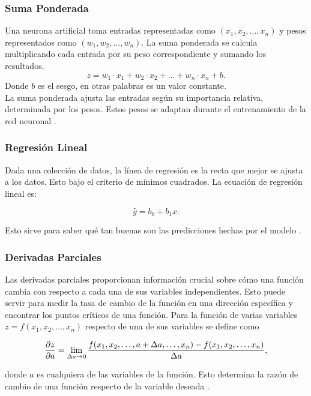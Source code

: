 \documentclass[titlepage,11pt]{article}
\begin{document}
	\subsubsection{Suma Ponderada}
		Una neurona artificial toma entradas representadas como $(x_1, x_2, \ldots, x_n)$ y pesos representados como $(w_1, w_2, \ldots, w_n)$. La suma ponderada se calcula multiplicando cada entrada por su peso correspondiente y sumando los resultados.
		$$z = w_1 \cdot x_1 + w_2 \cdot x_2 + \ldots + w_n \cdot x_n + b .$$
		Donde $b$ es el sesgo, en otras palabras es un valor constante.\\
		
		La suma ponderada ajusta las entradas según su importancia relativa, determinada por los pesos. Estos pesos se adaptan durante el entrenamiento de la red neuronal {\cite{triola_2018_estadstica}}.
		
	\subsubsection{Regresión Lineal}
	
		Dada una colección de datos, la línea de regresión es la recta que mejor se ajusta a los datos. Esto bajo el criterio de mínimos cuadrados. La ecuación de regresión lineal es:
		
		$$\hat{y}=b_0+b_1 x.$$
		
		Esto sirve para saber qu\'e tan buenas son las predicciones hechas por el modelo {\cite{triola_2018_estadstica}}.
	
	
	\subsubsection{Derivadas Parciales}
	
		Las derivadas parciales proporcionan información crucial sobre cómo una función cambia con respecto a cada una de sus variables independientes. Esto puede servir para medir la tasa de cambio de la función en una dirección específica y encontrar los puntos críticos de una función. Para la función de varias variables $z=f(x_1,x_2,\ldots,x_n)$ respecto de una de sus variables se define como
		
		$${\partial z\over\partial a}=\lim\limits_{\Delta a\rightarrow0}{f(x_1,x_2,\ldots,a+\Delta a,\ldots,x_n)-f(x_1,x_2,\ldots,x_n)\over\Delta a},$$
		
		\noindent donde $a$ es cualquiera de las variables de la función. Esto determina la razón de cambio de una función respecto de la variable deseada {\cite{zill_1985_clculo}}.
	
\end{document}
